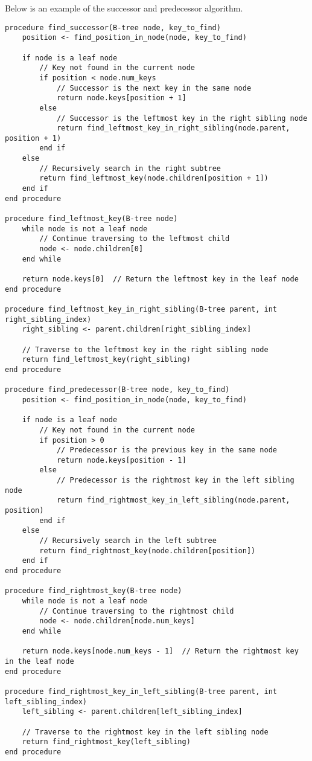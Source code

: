 \begin{highlight}

Below is an example of the successor and predecessor algorithm.

\horizontalline

\begin{verbatim}
procedure find_successor(B-tree node, key_to_find)
    position <- find_position_in_node(node, key_to_find)

    if node is a leaf node
        // Key not found in the current node
        if position < node.num_keys
            // Successor is the next key in the same node
            return node.keys[position + 1]
        else
            // Successor is the leftmost key in the right sibling node
            return find_leftmost_key_in_right_sibling(node.parent, position + 1)
        end if
    else
        // Recursively search in the right subtree
        return find_leftmost_key(node.children[position + 1])
    end if
end procedure

procedure find_leftmost_key(B-tree node)
    while node is not a leaf node
        // Continue traversing to the leftmost child
        node <- node.children[0]
    end while

    return node.keys[0]  // Return the leftmost key in the leaf node
end procedure

procedure find_leftmost_key_in_right_sibling(B-tree parent, int right_sibling_index)
    right_sibling <- parent.children[right_sibling_index]

    // Traverse to the leftmost key in the right sibling node
    return find_leftmost_key(right_sibling)
end procedure

procedure find_predecessor(B-tree node, key_to_find)
    position <- find_position_in_node(node, key_to_find)

    if node is a leaf node
        // Key not found in the current node
        if position > 0
            // Predecessor is the previous key in the same node
            return node.keys[position - 1]
        else
            // Predecessor is the rightmost key in the left sibling node
            return find_rightmost_key_in_left_sibling(node.parent, position)
        end if
    else
        // Recursively search in the left subtree
        return find_rightmost_key(node.children[position])
    end if
end procedure

procedure find_rightmost_key(B-tree node)
    while node is not a leaf node
        // Continue traversing to the rightmost child
        node <- node.children[node.num_keys]
    end while

    return node.keys[node.num_keys - 1]  // Return the rightmost key in the leaf node
end procedure

procedure find_rightmost_key_in_left_sibling(B-tree parent, int left_sibling_index)
    left_sibling <- parent.children[left_sibling_index]

    // Traverse to the rightmost key in the left sibling node
    return find_rightmost_key(left_sibling)
end procedure
\end{verbatim}

\end{highlight}

